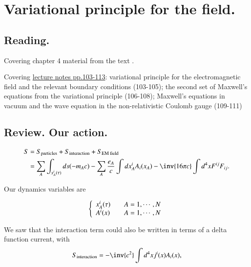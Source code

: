%
%

\chapter{Variational principle for the field.}
\label{chap:relativisticElectrodynamicsL13}
{}
\date{Feb 15, 2011}

\beginArtNoToc

\section{Reading.}

Covering chapter 4 material from the text \cite{landau1980classical}.

Covering \href{http://www.physics.utoronto.ca/~poppitz/epoppitz/PHY450_files/RelEMpp103-113.pdf}{lecture notes pp.103-113}: variational principle for the electromagnetic field and the relevant boundary conditions (103-105); the second set of Maxwell's equations from the variational principle (106-108); Maxwell's equations in vacuum and the wave equation in the non-relativistic Coulomb gauge (109-111)

\section{Review.  Our action.}

\begin{align*}
S
&= S_{\text{particles}} + S_{\text{interaction}} + S_{\text{EM field}} \\
&= \sum_A \int_{x_A^i(\tau)} ds ( -m_A c )
- \sum_A
\frac{e_A}{c}
\int dx_A^i A_i(x_A)
- \inv{16 \pi c} \int d^4 x F^{ij } F_{ij}.
\end{align*}

Our dynamics variables are

\begin{equation}\label{eqn:relativisticElectrodynamicsL13:30}
\left\{
\begin{array}{l l}
x_A^i(\tau) & \quad \mbox{$A = 1, \cdots, N$} \\
A^i(x) & \quad \mbox{$A = 1, \cdots, N$}
\end{array}
\right.
\end{equation}

We saw that the interaction term could also be written in terms of a delta function current, with
\begin{equation}\label{eqn:relativisticElectrodynamicsL13:50}
S_{\text{interaction}}
= -\inv{c^2} \int d^4x j^i(x) A_i(x),
\end{equation}

